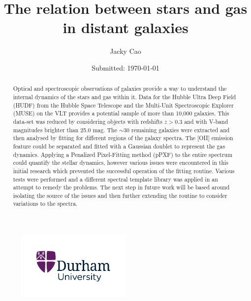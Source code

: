 \documentclass[12pt, twocolumn]{revtex4-1}    %
\begin{document}
                     

\begin{titlepage}
\title{The relation between stars and gas in distant galaxies} 
\date{Submitted: \today{}}
\author{Jacky Cao}

\begin{abstract}              
Optical and spectroscopic observations of galaxies provide a way to understand the internal dynamics of the stars and gas within it. Data for the Hubble Ultra Deep Field (HUDF) from the Hubble Space Telescope and the Multi-Unit Spectroscopic Explorer (MUSE) on the VLT provides a potential sample of more than 10,000 galaxies. This data-set was reduced by considering objects with redshifts $z>0.3$ and with V-band magnitudes brighter than 25.0 mag. The $\sim30$ remaining galaxies were extracted and then analysed by fitting for different regions of the galaxy spectra. The [OII] emission feature could be separated and fitted with a Gaussian doublet to represent the gas dynamics. Applying a Penalized Pixel-Fitting method (pPXF) to the entire spectrum could quantify the stellar dynamics, however various issues were encountered in this initial research which prevented the successful operation of the fitting routine. Various tests were performed and a different spectral template library was applied in an attempt to remedy the problems. The next step in future work will be based around isolating the source of the issues and then further extending the routine to consider variations to the spectra.
\end{abstract}
\begin{figure}[b]
\centering
\includegraphics[width=0.5\textwidth]{other/durham_university}
\end{figure}
\maketitle
\end{titlepage}
\end{document}
